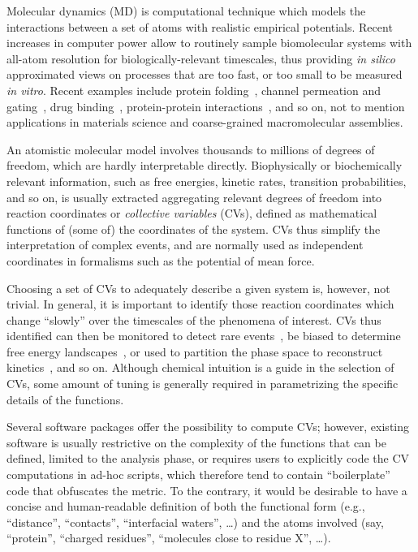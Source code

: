 \documentclass[preprint,review,11pt]{elsarticle}
\begin{document}
Molecular dynamics (MD) is computational technique which models the
interactions between a set of atoms with realistic empirical
potentials. Recent increases in computer power allow to routinely
sample biomolecular systems with all-atom resolution for
biologically-relevant timescales, thus providing \emph{in silico}
approximated views on processes that are too fast, or too small to be
measured \emph{in vitro}. Recent examples include protein
folding~\cite{Lindorff-Larsen_Piana_Dror_Shaw_2011}, channel
permeation and
gating~\cite{Jensen_Jogini_Borhani_Leffler_Dror_Shaw_2012}, drug
binding~\cite{Shan_Kim_Eastwood_Dror_Seeliger_Shaw_2011,Buch_Giorgino_2011},
protein-protein
interactions~\cite{Ahmad_Gu_Helms_2008,Giorgino_Buch_2012}, and so on,
not to mention applications in materials science and coarse-grained
macromolecular assemblies.

An atomistic molecular model involves thousands to millions of degrees
of freedom, which are hardly interpretable directly. Biophysically or
biochemically relevant information, such as free energies, kinetic
rates, transition probabilities, and so on,  is usually extracted
aggregating relevant degrees of freedom into reaction coordinates or
\emph{collective variables} (CVs), defined as mathematical functions of (some
of) the coordinates of the system.  CVs thus  simplify the
interpretation of complex events, and are normally used as independent
coordinates in formalisms such as the potential of mean force.

Choosing a set of CVs to adequately describe a given system is,
however, not trivial. In general, it is important to identify those
reaction coordinates which change ``slowly'' over the timescales of
the phenomena of interest. CVs thus identified can then be monitored
to detect rare events~\cite{Giorgino_Buch_2012}, be biased to
determine free energy landscapes~\cite{Laio_Parrinello_2002}, or used
to partition the phase space to reconstruct
kinetics~\cite{Biarnes_Pietrucci_Marinelli_Laio_2012,Noe_Fischer_2008},
and so on.  Although chemical intuition is a guide in the selection of
CVs, some amount of tuning is generally required in parametrizing the
specific details of the functions.

Several software packages offer the possibility to compute CVs;
however, existing software is usually restrictive on the complexity of
the functions that can be defined, limited to the analysis phase, or
requires users to explicitly code the CV computations in ad-hoc
scripts, which therefore tend to contain ``boilerplate'' code that
obfuscates the metric. To the contrary, it would be desirable to have
a concise and human-readable definition of both the functional form
(e.g., ``distance'', ``contacts'', ``interfacial waters'', \dots) and
 the atoms involved (say, ``protein'', ``charged residues'',
``molecules close to residue X'', \dots).
\end{document}
